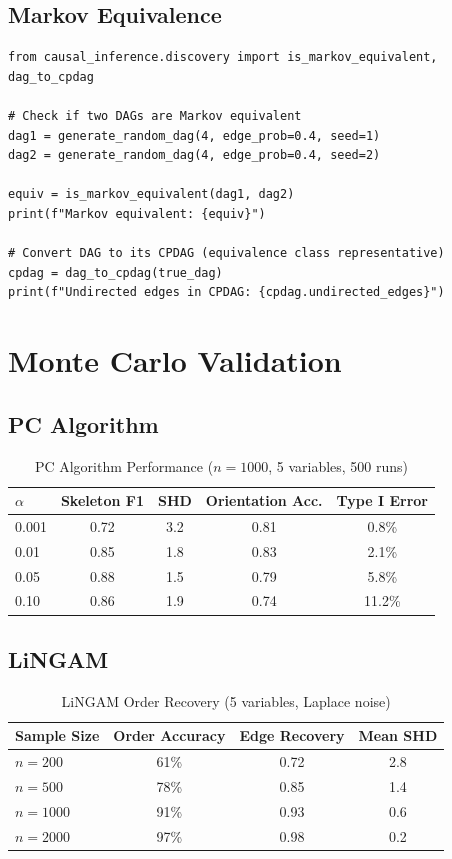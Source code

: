 \subsection{Markov Equivalence}

\begin{verbatim}
from causal_inference.discovery import is_markov_equivalent, dag_to_cpdag

# Check if two DAGs are Markov equivalent
dag1 = generate_random_dag(4, edge_prob=0.4, seed=1)
dag2 = generate_random_dag(4, edge_prob=0.4, seed=2)

equiv = is_markov_equivalent(dag1, dag2)
print(f"Markov equivalent: {equiv}")

# Convert DAG to its CPDAG (equivalence class representative)
cpdag = dag_to_cpdag(true_dag)
print(f"Undirected edges in CPDAG: {cpdag.undirected_edges}")
\end{verbatim}


\section{Monte Carlo Validation}

\subsection{PC Algorithm}

\begin{table}[h]
\centering
\caption{PC Algorithm Performance ($n=1000$, 5 variables, 500 runs)}
\begin{tabular}{lcccc}
\toprule
$\alpha$ & Skeleton F1 & SHD & Orientation Acc. & Type I Error \\
\midrule
0.001 & 0.72 & 3.2 & 0.81 & 0.8\% \\
0.01 & 0.85 & 1.8 & 0.83 & 2.1\% \\
0.05 & 0.88 & 1.5 & 0.79 & 5.8\% \\
0.10 & 0.86 & 1.9 & 0.74 & 11.2\% \\
\bottomrule
\end{tabular}
\end{table}

\subsection{LiNGAM}

\begin{table}[h]
\centering
\caption{LiNGAM Order Recovery (5 variables, Laplace noise)}
\begin{tabular}{lccc}
\toprule
Sample Size & Order Accuracy & Edge Recovery & Mean SHD \\
\midrule
$n=200$ & 61\% & 0.72 & 2.8 \\
$n=500$ & 78\% & 0.85 & 1.4 \\
$n=1000$ & 91\% & 0.93 & 0.6 \\
$n=2000$ & 97\% & 0.98 & 0.2 \\
\bottomrule
\end{tabular}
\end{table}

